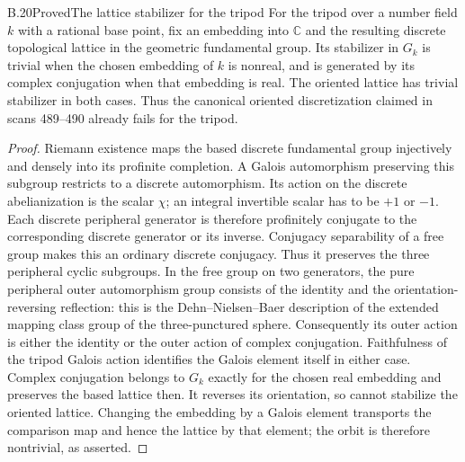 \begin{statement}{B.20}{Proved}{The lattice stabilizer for the tripod}
For the tripod over a number field $k$ with a rational base point,
fix an embedding into $\mathbb C$ and the resulting discrete
topological lattice in the geometric fundamental group.  Its
stabilizer in $G_k$ is trivial when the chosen embedding of $k$ is
nonreal, and is generated by its complex conjugation when that
embedding is real.  The oriented lattice has trivial stabilizer
in both cases.  Thus the canonical oriented discretization claimed
in scans 489--490 already fails for the tripod.
\end{statement}
\begin{proof}
Riemann existence maps the based discrete fundamental group injectively
and densely into its profinite completion.  A Galois automorphism
preserving this subgroup restricts to a discrete automorphism.
Its action on the discrete abelianization is the scalar $\chi$;
an integral invertible scalar has to be $+1$ or $-1$.  Each discrete
peripheral generator is therefore profinitely conjugate to the
corresponding discrete generator or its inverse.  Conjugacy
separability of a free group makes this an ordinary discrete
conjugacy.  Thus it preserves the three peripheral cyclic subgroups.
In the free group on two generators,
the pure peripheral outer automorphism group consists of the
identity and the orientation-reversing reflection: this is the
Dehn--Nielsen--Baer description of the extended mapping class group
of the three-punctured sphere.  Consequently its outer action is
either the identity or the outer action of complex conjugation.
Faithfulness of the tripod Galois action identifies the Galois
element itself in either case.  Complex conjugation belongs to
$G_k$ exactly for the chosen real embedding and preserves the based
lattice then.  It reverses its orientation, so cannot stabilize the
oriented lattice.  Changing the embedding by a Galois element
transports the comparison map and hence the lattice by that element;
the orbit is therefore nontrivial, as asserted.
\end{proof}

